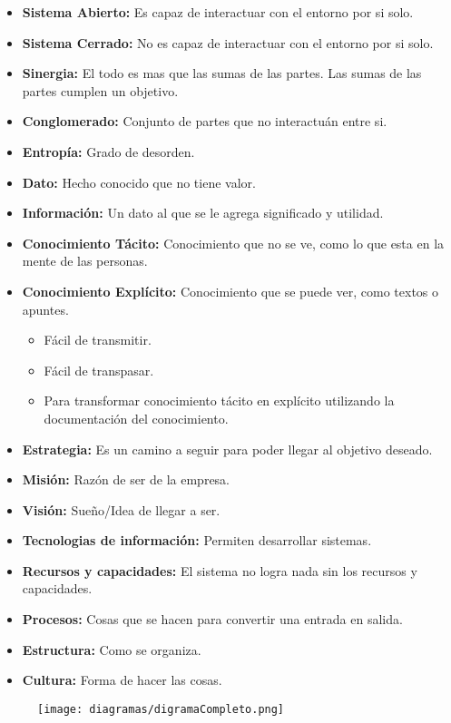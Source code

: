 \documentclass{templateNote}
\begin{document}
\begin{itemize}
    \item \textbf{Sistema Abierto:} Es capaz de interactuar con el entorno por si solo.
    \item \textbf{Sistema Cerrado:} No es capaz de interactuar con el entorno por si solo.
    \item \textbf{Sinergia:} El todo es mas que las sumas de las partes. Las sumas de las partes cumplen un objetivo.
    \item \textbf{Conglomerado:} Conjunto de partes que no interactuán entre si.
    \item \textbf{Entropía:} Grado de desorden.
    \item \textbf{Dato:} Hecho conocido que no tiene valor.
    \item \textbf{Información:} Un dato al que se le agrega significado y utilidad.
    \item \textbf{Conocimiento Tácito:} Conocimiento que no se ve, como lo que esta en la mente de las personas.
    \item \textbf{Conocimiento Explícito:} Conocimiento que se puede ver, como textos o apuntes.
    \begin{itemize}
        \item Fácil de transmitir.
        \item Fácil de transpasar.
        \item Para transformar conocimiento tácito en explícito utilizando la documentación del conocimiento.
    \end{itemize}
    \item \textbf{Estrategia:} Es un camino a seguir para poder llegar al objetivo deseado.
    \item \textbf{Misión:} Razón de ser de la empresa.
    \item \textbf{Visión:} Sueño/Idea de llegar a ser.
    \item \textbf{Tecnologias de información:} Permiten desarrollar sistemas.
    \item \textbf{Recursos y capacidades:} El sistema no logra nada sin los recursos y capacidades.
    \item \textbf{Procesos:} Cosas que se hacen para convertir una entrada en salida.
    \item \textbf{Estructura:} Como se organiza.
    \item \textbf{Cultura:} Forma de hacer las cosas.
\end{itemize}

\begin{landscape}
    \begin{figure}[H]
        \centering
        \texttt{[image: diagramas/digramaCompleto.png]}
    \end{figure}
\end{landscape}
\end{document}
